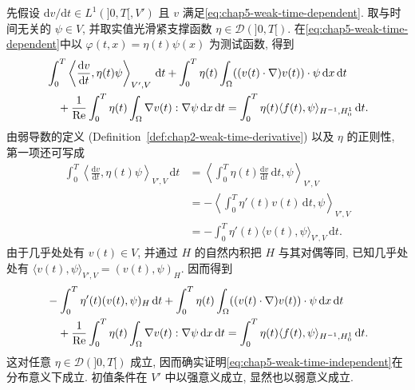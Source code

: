 \begin{Proof}
先假设 $\mathrm dv/\mathrm dt\in L^1(]0,T[,V')$ 且 $v$ 满足\eqref{eq:chap5-weak-time-dependent}. 取与时间无关的 $\psi\in V$, 并取实值光滑紧支撑函数 $\eta\in\mathcal D(]0,T[)$. 在\eqref{eq:chap5-weak-time-dependent}中以 $\varphi(t,x)=\eta(t)\psi(x)$ 为测试函数, 得到
\begin{align}
 &\int_0^T\left\langle\frac{\mathrm dv}{\mathrm dt},\eta(t)\psi\right\rangle_{V',V}\,\mathrm dt
 +\int_0^T\eta(t)\int_\Omega((v(t)\cdot\nabla)v(t))\cdot\psi\,\mathrm dx\,\mathrm dt\notag\\
 &\quad+\frac1{\operatorname{Re}}\int_0^T\eta(t)\int_\Omega\nabla v(t):\nabla\psi\,\mathrm dx\,\mathrm dt
 =\int_0^T\eta(t)\langle f(t),\psi\rangle_{H^{-1},H_0^1}\,\mathrm dt.
\label{eq:chap5-equivalence-separated-test}
\end{align}
由弱导数的定义 (Definition~\ref{def:chap2-weak-time-derivative}) 以及 $\eta$ 的正则性, 第一项还可写成
\begin{align*}
 \int_0^T\left\langle\frac{\mathrm dv}{\mathrm dt},\eta(t)\psi\right\rangle_{V',V}\,\mathrm dt
 &=\left\langle\int_0^T\eta(t)\frac{\mathrm dv}{\mathrm dt}\,\mathrm dt,\psi\right\rangle_{V',V}\\
 &=-\left\langle\int_0^T\eta'(t)v(t)\,\mathrm dt,\psi\right\rangle_{V',V}\\
 &=-\int_0^T\eta'(t)\langle v(t),\psi\rangle_{V',V}\,\mathrm dt.
\end{align*}
由于几乎处处有 $v(t)\in V$, 并通过 $H$ 的自然内积把 $H$ 与其对偶等同, 已知几乎处处有 $\langle v(t),\psi\rangle_{V',V}=(v(t),\psi)_H$. 因而得到
\begin{align}
 &-\int_0^T\eta'(t)(v(t),\psi)_H\,\mathrm dt
 +\int_0^T\eta(t)\int_\Omega((v(t)\cdot\nabla)v(t))\cdot\psi\,\mathrm dx\,\mathrm dt\notag\\
 &\quad+\frac1{\operatorname{Re}}\int_0^T\eta(t)\int_\Omega\nabla v(t):\nabla\psi\,\mathrm dx\,\mathrm dt
 =\int_0^T\eta(t)\langle f(t),\psi\rangle_{H^{-1},H_0^1}\,\mathrm dt.
\label{eq:chap5-equivalence-distribution-form}
\end{align}
这对任意 $\eta\in\mathcal D(]0,T[)$ 成立, 因而确实证明\eqref{eq:chap5-weak-time-independent}在分布意义下成立. 初值条件在 $V'$ 中以强意义成立, 显然也以弱意义成立.


\end{Proof}
